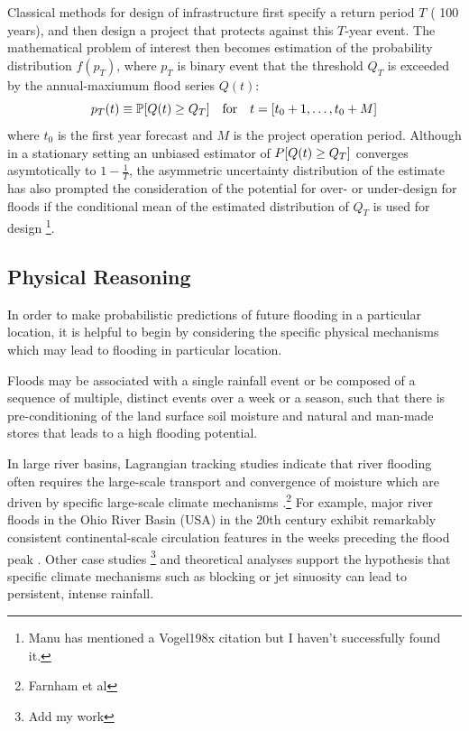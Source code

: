 \documentclass[12pt]{article}
\begin{document}
Classical methods for design of infrastructure first specify a return period \(T\) (\ie{} 100 years), and then design a project that protects against this \(T\)-year event.
The mathematical problem of interest then becomes estimation of the probability distribution \( f(p_T) \), where \( p_T \) is binary event that the threshold \( Q_T \) is exceeded by the annual-maxiumum flood series \( Q(t) \):
\begin{equation*}
  p_T(t) \equiv \probability \qty[ Q(t) \geq Q_T] \qqtext{for} t = \qty[t_0 + 1, \ldots, t_0 + M]
\end{equation*}
where \( t_0 \) is the first year forecast and \( M \) is the project operation period.
Although in a stationary setting an unbiased estimator of \( P \qty[ Q(t) \geq Q_T] \) converges asymtotically to \(1 - \frac{1}{T}\), the asymmetric uncertainty distribution of the estimate has also prompted the consideration of the potential for over- or under-design for floods if the conditional mean of the estimated distribution of \( Q_T \) is used for design \citep{Stedinger1997}\footnote{Manu has mentioned a Vogel198x citation but I haven't successfully found it.}.

\subsection{Physical Reasoning}

In order to make probabilistic predictions of future flooding in a particular location, it is helpful to begin by considering the specific physical mechanisms which may lead to flooding in particular location.

Floods may be associated with a single rainfall event or be composed of a sequence of multiple, distinct events over a week or a season, such that there is pre-conditioning of the land surface soil moisture and natural and man-made stores that leads to a high flooding potential.

In large river basins, Lagrangian tracking studies \citep{Gimeno2010} indicate that river flooding often requires the large-scale transport and convergence of moisture  which are driven by specific large-scale climate mechanisms \citep{Dacre2014,Gimeno2014,Lu2013,Dirmeyer2010}.\footnote{Farnham et al}
For example, major river floods in the Ohio River Basin (USA) in the 20th century exhibit remarkably consistent continental-scale circulation features in the weeks preceding the flood peak \citep{Nakamura2012,Robertson2015}.
Other case studies \citep{Grams2014,Stadtherr2016}\footnote{Add my work} and theoretical analyses \citep{Hoskins2015,Screen2014,Coumou2014} support the hypothesis that specific climate mechanisms such as blocking or jet sinuosity  can lead to persistent, intense rainfall.
\end{document}
